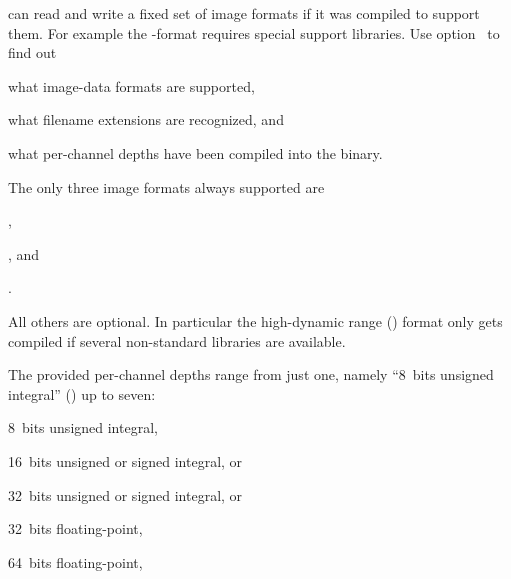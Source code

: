 \App{} can read and write a fixed set of image formats if it was compiled to support them.  For
example the -format requires special support libraries.  Use
option~ to find out

\begin{compactitemize}
\item
  what image-data formats are supported,

\item
  what filename extensions are recognized, and

\item
  what per-channel depths have been compiled into the \appcmd{} binary.
\end{compactitemize}

\noindent The only three image formats always supported are

\begin{compactitemize}
\item
  ,

\item
  , and

\item
  .
\end{compactitemize}

%
\noindent All others are optional.  In particular the high-dynamic range () format
 only gets compiled if several non-standard libraries are available.

The provided per-channel depths range from just one, namely ``8~bits unsigned integral''
() up to seven:

\begin{compactitemize}
\item
  8~bits unsigned integral, 

\item
  16~bits unsigned or signed integral,  or 

\item
  32~bits unsigned or signed integral,  or 

\item
  32~bits floating-point, 

\item
  64~bits floating-point, 
\end{compactitemize}

